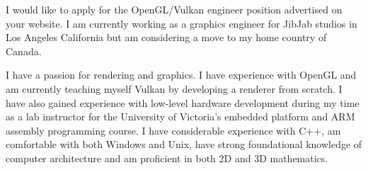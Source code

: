 I would like to apply for the OpenGL/Vulkan engineer position advertised on your website.
I am currently working as a graphics engineer for JibJab studios in Los Angeles California but am considering a move to my home country of Canada.

I have a passion for rendering and graphics. 
I have experience with OpenGL and am currently teaching myself Vulkan by developing a renderer from scratch.
I have also gained experience with low-level hardware development during my time as a lab instructor for the University of Victoria's embedded platform and ARM assembly programming course. 
I have considerable experience with C++, am comfortable with both Windows and Unix, have strong foundational knowledge of computer architecture and am proficient in both 2D and 3D mathematics.